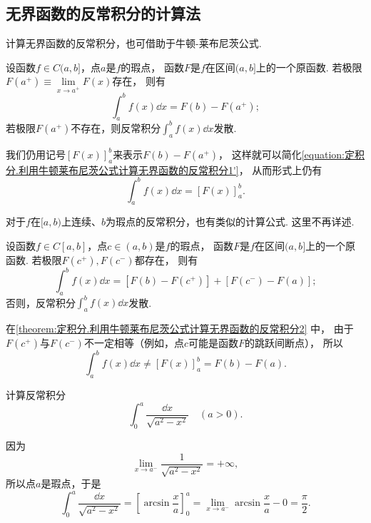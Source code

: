 \subsection{无界函数的反常积分的计算法}
计算无界函数的反常积分，也可借助于牛顿-莱布尼茨公式.
\begin{theorem}\label{theorem:定积分.利用牛顿莱布尼茨公式计算无界函数的反常积分1}
设函数\(f \in C(a,b]\)，点\(a\)是\(f\)的瑕点，%
函数\(F\)是\(f\)在区间\((a,b]\)上的一个原函数.
若极限\(F(a^+) \equiv \lim\limits_{x \to a^+} F(x)\)存在，%
则有
\begin{equation}\label{equation:定积分.利用牛顿莱布尼茨公式计算无界函数的反常积分1'}
\int_a^b f(x) \dd{x}
= F(b) - F(a^+);
\end{equation}
若极限\(F(a^+)\)不存在，则反常积分\(\int_a^b f(x) \dd{x}\)发散.
\end{theorem}
我们仍用记号\([F(x)]_a^b\)来表示\(F(b) - F(a^+)\)，%
这样就可以简化\cref{equation:定积分.利用牛顿莱布尼茨公式计算无界函数的反常积分1'}，%
从而形式上仍有
\begin{equation}\label{equation:定积分.利用牛顿莱布尼茨公式计算无界函数的反常积分1}
\int_a^b f(x) \dd{x} = [F(x)]_a^b.
\end{equation}

对于\(f\)在\([a,b)\)上连续、\(b\)为瑕点的反常积分，也有类似的计算公式.
这里不再详述.

\begin{theorem}\label{theorem:定积分.利用牛顿莱布尼茨公式计算无界函数的反常积分2}
设函数\(f \in C[a,b]\)，点\(c\in(a,b)\)是\(f\)的瑕点，%
函数\(F\)是\(f\)在区间\((a,b]\)上的一个原函数.
若极限\(F(c^+),F(c^-)\)都存在，%
则有
\begin{equation}\label{equation:定积分.利用牛顿莱布尼茨公式计算无界函数的反常积分2}
\int_a^b f(x) \dd{x}
= [F(b) - F(c^+)] + [F(c^-) - F(a)];
\end{equation}
否则，反常积分\(\int_a^b f(x) \dd{x}\)发散.
\end{theorem}
在\cref{theorem:定积分.利用牛顿莱布尼茨公式计算无界函数的反常积分2} 中，%
由于\(F(c^+)\)与\(F(c^-)\)不一定相等（例如，点\(c\)可能是函数\(F\)的跳跃间断点），%
所以\[
\int_a^b f(x) \dd{x}
\neq [F(x)]_a^b = F(b) - F(a).
\]

\begin{example}
计算反常积分\[
\int_0^a \frac{\dd{x}}{\sqrt{a^2-x^2}}\quad(a>0).
\]
\begin{solution}
因为\[
\lim\limits_{x \to a^-} \frac{1}{\sqrt{a^2-x^2}} = +\infty,
\]所以点\(a\)是瑕点，于是\[
\int_0^a \frac{\dd{x}}{\sqrt{a^2-x^2}}
= \left[ \arcsin\frac{x}{a} \right]_0^a
= \lim\limits_{x \to a^-} \arcsin\frac{x}{a} - 0 = \frac{\pi}{2}.
\]
\end{solution}
\end{example}


